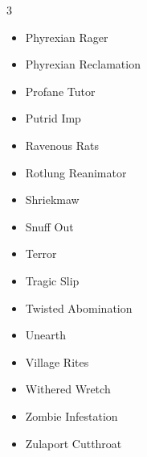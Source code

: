 \documentclass[11pt]{article}
\begin{document}
\begin{multicols}{3}
\begin{itemize}[leftmargin=1em,itemsep=0pt,parsep=0pt]
\item Phyrexian Rager
\item Phyrexian Reclamation
\item Profane Tutor
\item Putrid Imp
\item Ravenous Rats
\item Rotlung Reanimator
\item Shriekmaw
\item Snuff Out
\item Terror
\item Tragic Slip
\item Twisted Abomination
\item Unearth
\item Village Rites
\item Withered Wretch
\item Zombie Infestation
\item Zulaport Cutthroat
\end{itemize}
\end{multicols}
\end{document}
